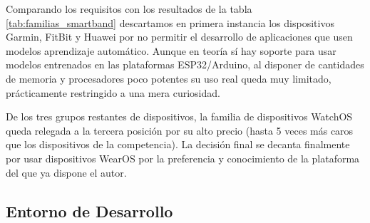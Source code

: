 
Comparando los requisitos con los resultados de la tabla \ref{tab:familias_smartband} descartamos en primera instancia los dispositivos Garmin, FitBit y Huawei por no permitir el desarrollo de aplicaciones que usen modelos aprendizaje automático. Aunque en teoría sí hay soporte para usar modelos entrenados en las plataformas ESP32/Arduino, al disponer de cantidades de memoria y procesadores poco potentes su uso real queda muy limitado, prácticamente restringido a una mera curiosidad.

De los tres grupos restantes de dispositivos, la familia de dispositivos WatchOS queda relegada a la tercera posición por su alto precio (hasta 5 veces más caros que los dispositivos de la competencia). La decisión final se decanta finalmente por usar dispositivos WearOS por la preferencia y conocimiento de la plataforma del que ya dispone el autor.

\subsection{Entorno de Desarrollo}

